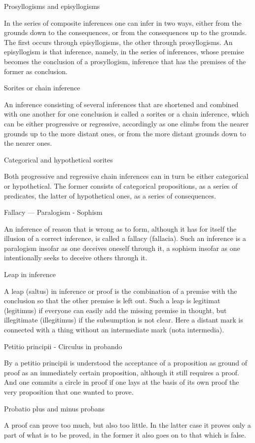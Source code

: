 Prosyllogisms and episyllogisms

In the series of composite inferences one can infer in two ways,
either from the grounds down to the consequences, or
from the consequences up to the grounds.
The first occurs through episyllogisms,
the other through prosyllogisms.
An episyllogism is that inference, namely, in the series of inferences,
whose premise becomes the conclusion of a prosyllogism,
inference that has the premises of the former as conclusion.

Sorites or chain inference

An inference consisting of several inferences
that are shortened and combined with one another for one conclusion
is called a sorites or a chain inference,
which can be either progressive or regressive,
accordingly as one climbs from the nearer grounds
up to the more distant ones,
or from the more distant grounds
down to the nearer ones.

Categorical and hypothetical sorites

Both progressive and regressive chain inferences
can in turn be either categorical or hypothetical.
The former consists of categorical propositions,
as a series of predicates,
the latter of hypothetical ones,
as a series of consequences.

Fallacy — Paralogism - Sophism

An inference of reason that is wrong as to form,
although it has for itself the illusion of a correct inference,
is called a fallacy (fallacia).
Such an inference is a paralogism insofar as
one deceives oneself through it,
a sophism insofar as one intentionally seeks
to deceive others through it.

Leap in inference

A leap (saltus) in inference or proof is
the combination of a premise with the conclusion
so that the other premise is left out.
Such a leap is legitimat (legitimus)
if everyone can easily add the missing premise in thought,
but illegitimate (illegitimus) if the subsumption is not clear.
Here a distant mark is connected with a thing
without an intermediate mark (nota intermedia).

Petitio principii - Circulus in probando

By a petitio principii is understood
the acceptance of a proposition as ground of proof
as an immediately certain proposition,
although it still requires a proof.
And one commits a circle in proof
if one lays at the basis of its own proof
the very proposition that one wanted to prove.

Probatio plus and minus probans

A proof can prove too much, but also too little.
In the latter case it proves only a part of what is to be proved,
in the former it also goes on to that which is false.

